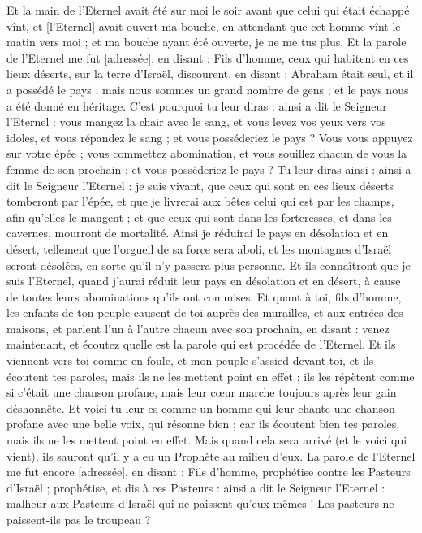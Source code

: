 \begin{multicols}{2}
Et la main de l'Eternel avait été sur moi le soir avant que celui qui était échappé vînt, et [l'Eternel] avait ouvert ma bouche, en attendant que cet homme vînt le matin vers moi ; et ma bouche ayant été ouverte, je ne me tus plus.
Et la parole de l'Eternel me fut [adressée], en disant :
Fils d'homme, ceux qui habitent en ces lieux déserts, sur la terre d'Israël, discourent, en disant : Abraham était seul, et il a possédé le pays ; mais nous sommes un grand nombre de gens ; et le pays nous a été donné en héritage.
C'est pourquoi tu leur diras : ainsi a dit le Seigneur l'Eternel : vous mangez la chair avec le sang, et vous levez vos yeux vers vos idoles, et vous répandez le sang ; et vous posséderiez le pays ?
Vous vous appuyez sur votre épée ; vous commettez abomination, et vous souillez chacun de vous la femme de son prochain ; et vous posséderiez le pays ?
Tu leur diras ainsi : ainsi a dit le Seigneur l'Eternel : je suis vivant, que ceux qui sont en ces lieux déserts tomberont par l'épée, et que je livrerai aux bêtes celui qui est par les champs, afin qu'elles le mangent ; et que ceux qui sont dans les forteresses, et dans les cavernes, mourront de mortalité.
Ainsi je réduirai le pays en désolation et en désert, tellement que l'orgueil de sa force sera aboli, et les montagnes d'Israël seront désolées, en sorte qu'il n'y passera plus personne.
Et ils connaîtront que je suis l'Eternel, quand j'aurai réduit leur pays en désolation et en désert, à cause de toutes leurs abominations qu'ils ont commises.
Et quant à toi, fils d'homme, les enfants de ton peuple causent de toi auprès des murailles, et aux entrées des maisons, et parlent l'un à l'autre chacun avec son prochain, en disant : venez maintenant, et écoutez quelle est la parole qui est procédée de l'Eternel.
Et ils viennent vers toi comme en foule, et mon peuple s'assied devant toi, et ils écoutent tes paroles, mais ils ne les mettent point en effet ; ils les répètent comme si c'était une chanson profane, mais leur cœur marche toujours après leur gain déshonnête.
Et voici tu leur es comme un homme qui leur chante une chanson profane avec une belle voix, qui résonne bien ; car ils écoutent bien tes paroles, mais ils ne les mettent point en effet.
Mais quand cela sera arrivé (et le voici qui vient), ils sauront qu'il y a eu un Prophète au milieu d'eux.
\VerseOne{}La parole de l'Eternel me fut encore [adressée], en disant :
Fils d'homme, prophétise contre les Pasteurs d'Israël ; prophétise, et dis à ces Pasteurs : ainsi a dit le Seigneur l'Eternel : malheur aux Pasteurs d'Israël qui ne paissent qu'eux-mêmes ! Les pasteurs ne paissent-ils pas le troupeau ?

\end{multicols}
